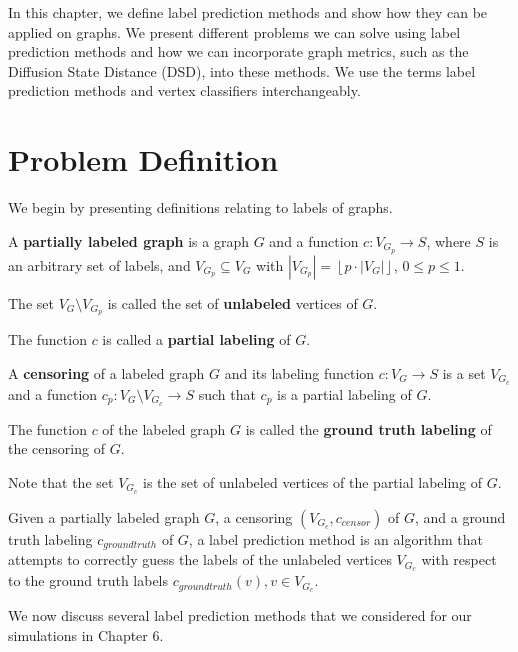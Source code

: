 In this chapter, we define label prediction methods and show how they can be applied on graphs. We present different problems we can solve using label prediction methods and how we can incorporate graph metrics, such as the Diffusion State Distance (DSD), into these methods. We use the terms label prediction methods and vertex classifiers interchangeably.

\section{Problem Definition}
\label{sec:label_prediction_methods}
We begin by presenting definitions relating to labels of graphs.

\begin{definition}
A \textbf{partially labeled graph} is a graph $G$ and a function $c : V_{G_p} \to S$,
where $S$ is an arbitrary set of labels, and $V_{G_p} \subseteq V_G$ with
$|V_{G_p}| = \left\lfloor{p \cdot |V_G|}\right\rfloor$, $0 \leq p \leq 1$.

The set $V_G \setminus V_{G_p}$ is called the set of \textbf{unlabeled} vertices of $G$.

The function $c$ is called a \textbf{partial labeling} of $G$.
\end{definition}

\begin{definition}
A \textbf{censoring} of a labeled graph $G$ and its labeling function $c : V_G \to S$
is a set $V_{G_c}$ and a function $c_p: V_G \setminus V_{G_c} \to S$ such that
$c_p$ is a partial labeling of $G$.

The function $c$ of the labeled graph $G$ is called the \textbf{ground truth labeling} of the censoring of $G$.

Note that the set $V_{G_c}$ is the set of unlabeled vertices of the partial labeling of $G$.
\end{definition}

Given a partially labeled graph $G$, a censoring $(V_{G_c}, c_{censor})$ of $G$,
and a ground truth labeling $c_{ground truth}$ of $G$, a label prediction method is
an algorithm that attempts to correctly guess the labels of the unlabeled vertices $V_{G_c}$
with respect to the ground truth labels $c_{ground truth}(v), v \in V_{G_c}$.

We now discuss several label prediction methods that we considered for our simulations in Chapter 6.


